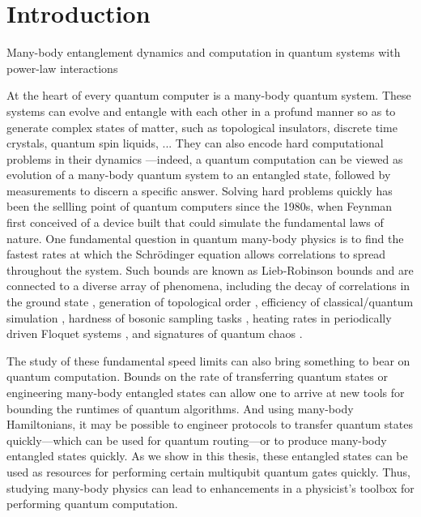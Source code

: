 \chapter{Introduction}

Many-body entanglement dynamics and computation in quantum systems with power-law interactions

At the heart of every quantum computer is a many-body quantum system.
These systems can evolve and entangle with each other in a profund manner so as to generate complex states of matter, such as topological insulators, discrete time crystals, quantum spin liquids, ...
They can also encode hard computational problems in their dynamics %
---indeed, a quantum computation can be viewed as evolution of a many-body quantum system to an entangled state, followed by measurements to discern a specific answer.
%
Solving hard problems quickly has been the sellling point of quantum computers since the 1980s, when Feynman first conceived of a device built that could simulate the fundamental laws of nature.
One fundamental question in quantum many-body physics is to find the fastest rates at which the  Schr\"odinger equation allows correlations to spread throughout the system.
Such bounds are known as Lieb-Robinson bounds and are connected to a diverse array of phenomena, including the decay of correlations in the ground state \cite{Hastings2006}, generation of topological order \cite{Bravyi2006, Bravyi2010}, efficiency of classical/quantum simulation \cite{Osborne2006,Tran2019a}, hardness of bosonic sampling tasks \cite{Deshpande2018}, heating rates in periodically driven Floquet systems \cite{Abanin2015,Tran2019b}, and signatures of quantum chaos \cite{Lashkari2013,Guo2019}.

The study of these fundamental speed limits can also bring something to bear on quantum computation.
Bounds on the rate of transferring quantum states or engineering many-body entangled states can allow one to arrive at new tools for bounding the runtimes of quantum algorithms.
And using many-body Hamiltonians, it may be possible to engineer protocols to transfer quantum states quickly---which can be used for quantum routing---or to produce many-body entangled states quickly. As we show in this thesis, these entangled states can be used as resources for performing certain multiqubit quantum gates quickly. Thus, studying many-body physics can lead to enhancements in a physicist's toolbox for performing quantum computation.

